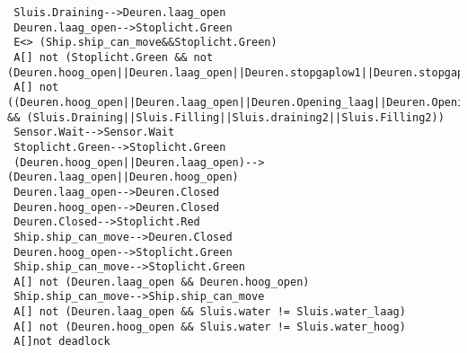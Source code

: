   \begin{verbatim}
 Sluis.Draining-->Deuren.laag_open
 Deuren.laag_open-->Stoplicht.Green
 E<> (Ship.ship_can_move&&Stoplicht.Green)
 A[] not (Stoplicht.Green && not (Deuren.hoog_open||Deuren.laag_open||Deuren.stopgaplow1||Deuren.stopgaplow2||Deuren.stopgaphigh1||Deuren.stopgaphigh2))
 A[] not ((Deuren.hoog_open||Deuren.laag_open||Deuren.Opening_laag||Deuren.Opening_hoog||Deuren.Closing_hoog||Deuren.Closing_laag) && (Sluis.Draining||Sluis.Filling||Sluis.draining2||Sluis.Filling2))
 Sensor.Wait-->Sensor.Wait
 Stoplicht.Green-->Stoplicht.Green
 (Deuren.hoog_open||Deuren.laag_open)-->(Deuren.laag_open||Deuren.hoog_open)
 Deuren.laag_open-->Deuren.Closed
 Deuren.hoog_open-->Deuren.Closed
 Deuren.Closed-->Stoplicht.Red
 Ship.ship_can_move-->Deuren.Closed
 Deuren.hoog_open-->Stoplicht.Green
 Ship.ship_can_move-->Stoplicht.Green
 A[] not (Deuren.laag_open && Deuren.hoog_open)
 Ship.ship_can_move-->Ship.ship_can_move
 A[] not (Deuren.laag_open && Sluis.water != Sluis.water_laag)
 A[] not (Deuren.hoog_open && Sluis.water != Sluis.water_hoog)
 A[]not deadlock
  \end{verbatim}

